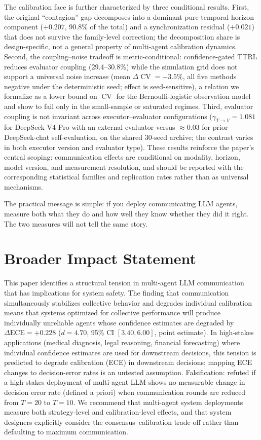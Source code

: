 \documentclass[11pt]{article}
\DeclareMathOperator{\CV}{CV}
\begin{document}
The calibration face is further characterized by three conditional results. First, the original ``contagion'' gap decomposes into a dominant pure temporal-horizon component ($+0.207$, 90.8\% of the total) and a synchronization residual ($+0.021$) that does not survive the family-level correction; the decomposition share is design-specific, not a general property of multi-agent calibration dynamics. Second, the coupling--noise tradeoff is metric-conditional: confidence-gated TTRL reduces evaluator coupling (29.4--30.8\%) while the simulation grid does not support a universal noise increase (mean $\Delta\CV = -3.5\%$, all five methods negative under the deterministic seed; effect is seed-sensitive), a relation we formalize as a lower bound on $\CV$ for the Bernoulli-logistic observation model and show to fail only in the small-sample or saturated regimes. Third, evaluator coupling is not invariant across executor--evaluator configurations ($\gamma_{T\to V}{=}1.081$ for DeepSeek-V4-Pro with an external evaluator versus $\approx 0.03$ for prior DeepSeek-chat self-evaluation, on the shared 30-seed archive; the contrast varies in both executor version and evaluator type). These results reinforce the paper's central scoping: communication effects are conditional on modality, horizon, model version, and measurement resolution, and should be reported with the corresponding statistical families and replication rates rather than as universal mechanisms.

The practical message is simple: if you deploy communicating LLM agents, measure both what they do and how well they know whether they did it right. The two measures will not tell the same story.

\section*{Broader Impact Statement}

This paper identifies a structural tension in multi-agent LLM communication that has implications for system safety. The finding that communication simultaneously stabilizes collective behavior and degrades individual calibration means that systems optimized for collective performance will produce individually unreliable agents whose confidence estimates are degraded by $\Delta\text{ECE} = +0.228$ ($d = 4.70$, 95\% CI $[3.40, 6.00]$, point estimate). In high-stakes applications (medical diagnosis, legal reasoning, financial forecasting) where individual confidence estimates are used for downstream decisions, this tension is predicted to degrade calibration (ECE) in downstream decisions; mapping ECE changes to decision-error rates is an untested assumption. Falsification: refuted if a high-stakes deployment of multi-agent LLM shows no measurable change in decision error rate (defined a priori) when communication rounds are reduced from $T = 20$ to $T = 10$. We recommend that multi-agent system deployments measure both strategy-level and calibration-level effects, and that system designers explicitly consider the consensus--calibration trade-off rather than defaulting to maximum communication.
\end{document}
